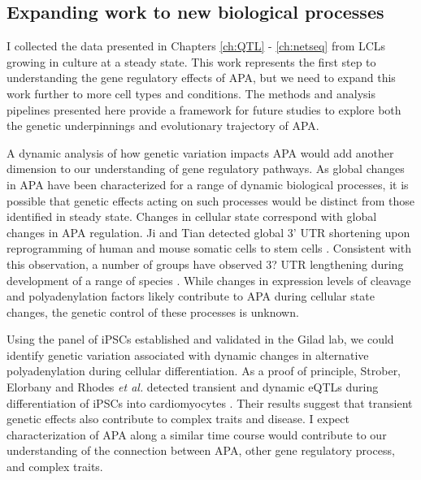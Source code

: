 \subsection{Expanding work to new biological processes}

I collected the data presented in Chapters \ref{ch:QTL} - \ref{ch:netseq} from LCLs growing in culture at a steady state. This work represents the first step to understanding the gene regulatory effects of APA, but we need to expand this work further to more cell types and conditions. The methods and analysis pipelines presented here provide a framework for future studies to explore both the genetic underpinnings and evolutionary trajectory of APA. 

A dynamic analysis of how genetic variation impacts APA would add another dimension to our understanding of gene regulatory pathways. As global changes in APA have been characterized for a range of dynamic biological processes, it is possible that genetic effects acting on such processes would be distinct from those identified in steady state. Changes in cellular state correspond with global changes in APA regulation. Ji and Tian detected global 3' UTR shortening upon reprogramming of human and mouse somatic cells to stem cells \citep{ji_progressive_2009}. Consistent with this observation, a number of groups have observed 3? UTR lengthening during development of a range of species \citep{ji_progressive_2009, hilgers_neural-specific_2011, li_dynamic_2012, mueller_alls_2013}. While changes in expression levels of cleavage and polyadenylation factors likely contribute to APA during cellular state changes, the genetic control of these processes is unknown. 

Using the panel of iPSCs established and validated in the Gilad lab, we could identify genetic variation associated with dynamic changes in alternative polyadenylation during cellular differentiation. As a proof of principle, Strober, Elorbany and Rhodes \emph{et al.} detected transient and dynamic eQTLs during differentiation of iPSCs into cardiomyocytes \citep{strober_dynamic_2019}. Their results suggest that transient genetic effects also contribute to complex traits and disease. I expect characterization of APA along a similar time course would contribute to our understanding of the connection between APA, other gene regulatory process, and complex traits.

